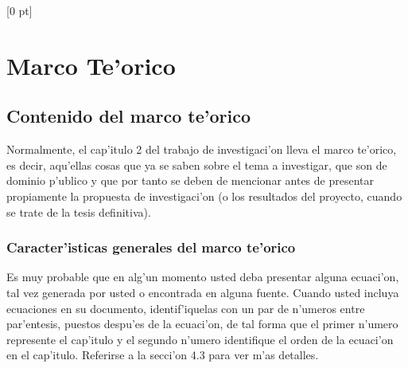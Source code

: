 \titlespacing{\chapter}{0 pt}{30 pt}{50 pt}[0 pt]
\titleformat{\section}{\Large\bfseries}{\thesection}{0 pt}{\hspace{30 pt}}
\titleformat{\subsection}{\large\bfseries}{\thesubsection}{0 pt}{\hspace{30 pt}}
\pagestyle{fancy}
\fancyhead[LO,LE]{\footnotesize\textit{\leftmark}}
\fancyhead[RO,RE]{\thepage}
\fancyfoot[CO,CE]{}

\chapter{Marco Te'orico} %

\normalsize

\section{Contenido del marco te'orico}
\noindent
Normalmente, el cap'itulo 2 del trabajo de investigaci'on lleva el marco te'orico, es decir, aqu'ellas cosas que ya se saben sobre el tema a investigar, que son de dominio p'ublico y que por tanto se deben de mencionar antes de presentar propiamente la propuesta de investigaci'on (o los resultados del proyecto, cuando se trate de la tesis definitiva).

\subsection{Caracter'isticas generales del marco te'orico}
\noindent
Es muy probable que en alg'un momento usted deba presentar alguna ecuaci'on, tal vez generada por usted o encontrada en alguna fuente. Cuando usted incluya ecuaciones en su documento, identif'iquelas con un par de n'umeros entre par'entesis, puestos despu'es de la ecuaci'on, de tal forma que el primer n'umero represente el cap'itulo y el segundo n'umero identifique el orden de la ecuaci'on en el cap'itulo. Referirse a la secci'on 4.3 para ver m'as detalles.

